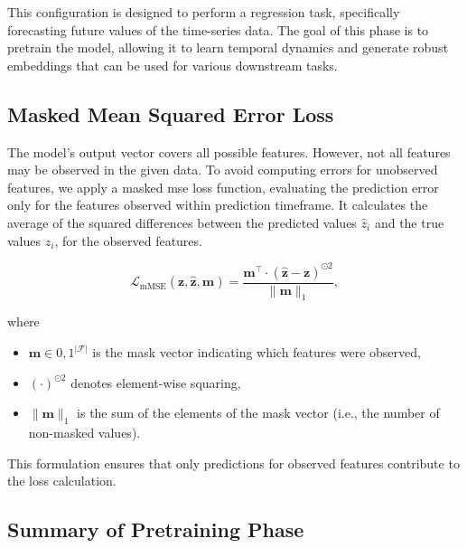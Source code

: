 This configuration is designed to perform a regression task, specifically forecasting future values of the time-series data. The goal of this phase is to pretrain the model, allowing it to learn temporal dynamics and generate robust embeddings that can be used for various downstream tasks.


\subsection{Masked Mean Squared Error Loss}

The model's output vector covers all possible features. However, not all features may be observed in the given data. To avoid computing errors for unobserved features, we apply a masked \gls{mse} loss function, evaluating the prediction error only for the features observed within prediction timeframe. It calculates the average of the squared differences between the predicted values \(\hat{z}_i\) and the true values \(z_i\), for the observed features.

\begin{equation}
    \label{eq:mmse}
    \mathcal{L}_{\text{mMSE}}( \mathbf{z}, \hat{\mathbf{z}}, \mathbf{m}) = \frac{\mathbf{m}^\top \cdot (\hat{\mathbf{z}} - \mathbf{z})^{\odot 2}}{\|\mathbf{m}\|_1}  ,
\end{equation}

where

\begin{itemize}
\item \( \mathbf{m} \in {0, 1}^|\mathcal{F}|\) is the mask vector indicating which features were observed,
\item \( (\cdot)^{\odot 2} \) denotes element-wise squaring,
\item \( \|\mathbf{m}\|_1 \) is the sum of the elements of the mask vector (i.e., the number of non-masked values).
\end{itemize}

This formulation ensures that only predictions for observed features contribute to the loss calculation.





\subsection{Summary of Pretraining Phase}

